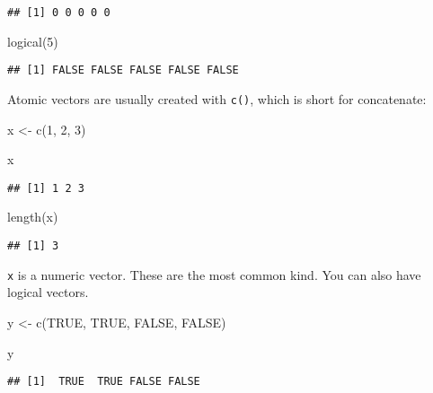 \documentclass[
]{book}
\newenvironment{Shaded}{\begin{snugshade}}{\end{snugshade}}
\newcommand{\ConstantTok}[1]{\textcolor[rgb]{0.00,0.00,0.00}{#1}}
\newcommand{\DecValTok}[1]{\textcolor[rgb]{0.00,0.00,0.81}{#1}}
\newcommand{\FunctionTok}[1]{\textcolor[rgb]{0.00,0.00,0.00}{#1}}
\newcommand{\NormalTok}[1]{#1}
\newcommand{\OtherTok}[1]{\textcolor[rgb]{0.56,0.35,0.01}{#1}}
\begin{document}
\begin{verbatim}
## [1] 0 0 0 0 0
\end{verbatim}

\begin{Shaded}
\begin{Highlighting}[]
\FunctionTok{logical}\NormalTok{(}\DecValTok{5}\NormalTok{)}
\end{Highlighting}
\end{Shaded}

\begin{verbatim}
## [1] FALSE FALSE FALSE FALSE FALSE
\end{verbatim}

Atomic vectors are usually created with \texttt{c()}, which is short for concatenate:

\begin{Shaded}
\begin{Highlighting}[]
\NormalTok{x }\OtherTok{\textless{}{-}} \FunctionTok{c}\NormalTok{(}\DecValTok{1}\NormalTok{, }\DecValTok{2}\NormalTok{, }\DecValTok{3}\NormalTok{)}

\NormalTok{x}
\end{Highlighting}
\end{Shaded}

\begin{verbatim}
## [1] 1 2 3
\end{verbatim}

\begin{Shaded}
\begin{Highlighting}[]
\FunctionTok{length}\NormalTok{(x)}
\end{Highlighting}
\end{Shaded}

\begin{verbatim}
## [1] 3
\end{verbatim}

\texttt{x} is a numeric vector. These are the most common kind. You can also have logical vectors.

\begin{Shaded}
\begin{Highlighting}[]
\NormalTok{y }\OtherTok{\textless{}{-}} \FunctionTok{c}\NormalTok{(}\ConstantTok{TRUE}\NormalTok{, }\ConstantTok{TRUE}\NormalTok{, }\ConstantTok{FALSE}\NormalTok{, }\ConstantTok{FALSE}\NormalTok{)}

\NormalTok{y}
\end{Highlighting}
\end{Shaded}

\begin{verbatim}
## [1]  TRUE  TRUE FALSE FALSE
\end{verbatim}
\end{document}
